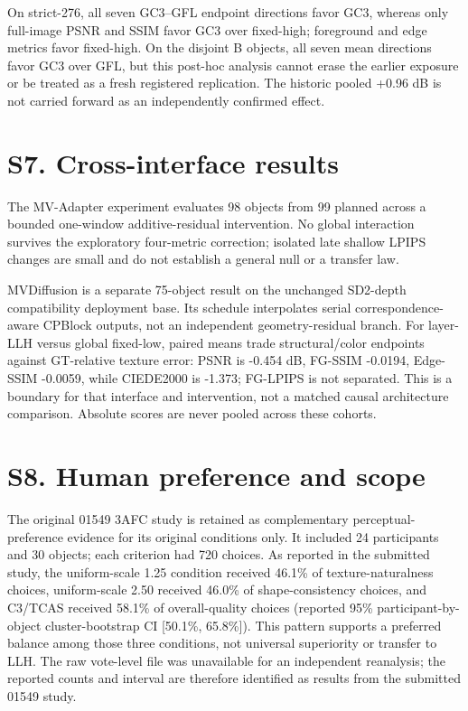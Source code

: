 \documentclass[10pt]{article}
\begin{document}
On strict-276, all seven GC3--GFL endpoint directions favor GC3, whereas only full-image PSNR and SSIM favor GC3 over fixed-high; foreground and edge metrics favor fixed-high. On the disjoint B objects, all seven mean directions favor GC3 over GFL, but this post-hoc analysis cannot erase the earlier exposure or be treated as a fresh registered replication. The historic pooled +0.96 dB is not carried forward as an independently confirmed effect.

\section{S7. Cross-interface results}

The MV-Adapter experiment evaluates 98 objects from 99 planned across a bounded one-window additive-residual intervention. No global interaction survives the exploratory four-metric correction; isolated late shallow LPIPS changes are small and do not establish a general null or a transfer law.

MVDiffusion is a separate 75-object result on the unchanged SD2-depth compatibility deployment base. Its schedule interpolates serial correspondence-aware CPBlock outputs, not an independent geometry-residual branch. For layer-LLH versus global fixed-low, paired means trade structural/color endpoints against GT-relative texture error: PSNR is -0.454 dB, FG-SSIM -0.0194, Edge-SSIM -0.0059, while CIEDE2000 is -1.373; FG-LPIPS is not separated. This is a boundary for that interface and intervention, not a matched causal architecture comparison. Absolute scores are never pooled across these cohorts.

\section{S8. Human preference and scope}

The original 01549 3AFC study is retained as complementary perceptual-preference evidence for its original conditions only. It included 24 participants and 30 objects; each criterion had 720 choices. As reported in the submitted study, the uniform-scale 1.25 condition received 46.1\% of texture-naturalness choices, uniform-scale 2.50 received 46.0\% of shape-consistency choices, and C3/TCAS received 58.1\% of overall-quality choices (reported 95\% participant-by-object cluster-bootstrap CI [50.1\%, 65.8\%]). This pattern supports a preferred balance among those three conditions, not universal superiority or transfer to LLH. The raw vote-level file was unavailable for an independent reanalysis; the reported counts and interval are therefore identified as results from the submitted 01549 study.
\end{document}
